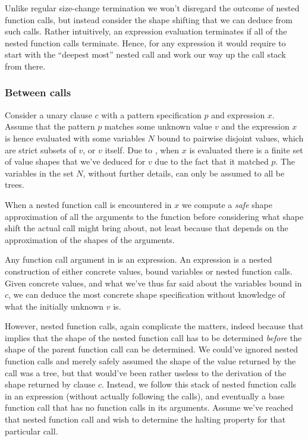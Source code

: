 Unlike regular size-change termination we won't disregard the outcome of nested
function calls, but instead consider the shape shifting that we can deduce from
such calls. Rather intuitively, an expression evaluation terminates if all of
the nested function calls terminate. Hence, for any expression it would require
to start with the ``deepest most'' nested call and work our way up the call
stack from there.

\subsubsection{Between calls}

Consider a unary clause $c$ with a pattern specification $p$ and expression
$x$. Assume that the pattern $p$ matches some unknown value $v$ and the
expression $x$ is hence evaluated with some variables $N$ bound to pairwise
disjoint values, which are strict subsets of $v$, or $v$ itself. Due to
, when $x$ is evaluated there is a finite
set of value shapes that we've deduced for $v$ due to the fact that it matched
$p$. The variables in the set $N$, without further details, can only be assumed
to all be trees.

When a nested function call is encountered in $x$ we compute a \emph{safe}
shape approximation of all the arguments to the function before considering
what shape shift the actual call might bring about, not least because that
depends on the approximation of the shapes of the arguments.

Any function call argument in \D{} is an expression. An expression is a nested
construction of either concrete values, bound variables or nested function
calls. Given concrete values, and what we've thus far said about the variables
bound in $c$, we can deduce the most concrete shape specification without
knowledge of what the initially unknown $v$ is.

However, nested function calls, again complicate the matters, indeed because
that implies that the shape of the nested function call has to be determined
\emph{before} the shape of the parent function call can be determined. We
could've ignored nested function calls and merely safely assumed the shape of
the value returned by the call was a tree, but that would've been rather
useless to the derivation of the shape returned by clause $c$. Instead, we
follow this stack of nested function calls in an expression (without actually
following the calls), and eventually a base function call that has no function
calls in its arguments. Assume we've reached that nested function call and wish
to determine the halting property for that particular call.

